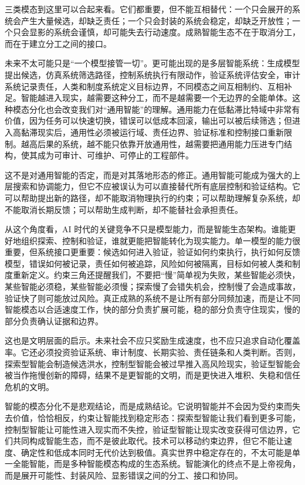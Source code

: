 
三类模态到这里可以合起来看。它们都重要，但不能互相替代：一个只会展开的系统会产生大量候选，却缺乏责任；一个只会封装的系统会稳定，却缺乏开放性；一个只会显影的系统会谨慎，却可能失去行动速度。成熟智能生态不在于取消分工，而在于建立分工之间的接口。

未来不太可能只是“一个模型接管一切”。更可能出现的是多层智能系统：生成模型提出候选，仿真系统筛选路径，控制系统执行有限动作，验证系统评估安全，审计系统记录责任，人类和制度系统定义目标边界，不同模态之间互相制约、互相补足。智能越进入现实，越需要这种分工，而不是越需要一个无边界的全能单体。这种模态分化也会改变我们对“通用智能”的理解。通用能力在低黏滞比特域中非常有价值，因为任务可以快速切换，错误可以低成本回滚，输出可以被后续筛选；但进入高黏滞现实后，通用性必须被运行域、责任边界、验证标准和控制接口重新限制。越高后果的系统，越不能只依靠开放通用性，越需要把通用能力压进专门结构，使其成为可审计、可维护、可停止的工程部件。

这不是对通用智能的否定，而是对其落地形态的修正。通用智能可能成为强大的上层搜索和协调能力，但它不应被误认为可以直接替代所有底层控制和验证结构。它可以帮助提出新的路径，却不能取消物理执行的约束；可以帮助理解复杂系统，却不能取消长期反馈；可以帮助生成判断，却不能替社会承担责任。

从这个角度看，AI 时代的关键竞争不只是模型能力，而是智能生态架构。谁能更好地组织探索、控制和验证，谁就更能把智能转化为现实能力。单一模型的能力很重要，但系统接口更重要：候选如何进入验证，验证如何约束执行，执行如何反馈模型，错误如何被记录，责任如何被追踪，风险如何被隔离，目标如何被人类和制度重新定义。约束三角还提醒我们，不要把“慢”简单视为失败，某些智能必须快，某些智能必须稳，某些智能必须慢；探索慢了会错失机会，控制慢了会造成事故，验证快了则可能放过风险。真正成熟的系统不是让所有部分同频加速，而是让不同智能模态以合适速度工作，快的部分负责扩展可能，稳的部分负责守住现实，慢的部分负责确认证据和边界。

这也是文明层面的启示。未来社会不应只奖励生成速度，也不应只追求自动化覆盖率。它还必须投资验证系统、审计制度、长期实验、责任链条和人类判断。否则，探索型智能会制造候选洪水，控制型智能会被过早推入高风险现实，验证型智能会被当作拖慢创新的障碍，结果不是更智能的文明，而是更快进入堆积、失稳和信任危机的文明。

智能的模态分化不是悲观结论，而是成熟结论。它说明智能并不会因为受约束而失去价值，恰恰相反，约束让智能找到稳定形态：探索型智能让我们看到更多可能，控制型智能让可能性进入现实而不失控，验证型智能让现实改变获得可信边界，它们共同构成智能生态，而不是彼此取代。技术可以移动约束边界，但它不能让速度、确定性和低成本同时无代价达到极值。真实世界中稳定存在的，不太可能是单一全能智能，而是多种智能模态构成的生态系统。智能演化的终点不是上帝视角，而是展开可能性、封装风险、显影错误之间的分工、接口和协同。

